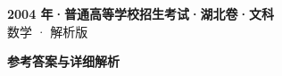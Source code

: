 \documentclass[zihao=-4, a4paper]{ctexart}
\begin{document}
\begin{center}
  {\Large\bfseries 2004 年·普通高等学校招生考试·湖北卷·文科}\\[4pt]
  {\large 数学 · 解析版}
\end{center}
\medskip
{}

\clearpage
{}
\begin{center}{\Large\bfseries 参考答案与详细解析}\end{center}
\medskip

\end{document}
